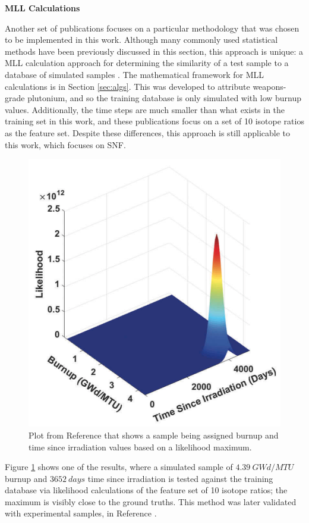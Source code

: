 \noindent \textbf{MLL Calculations}

Another set of publications focuses on a particular methodology that was chosen
to be implemented in this work. Although many commonly used statistical methods
have been previously discussed in this section, this approach is unique: a
\gls{MLL} calculation approach for determining the similarity of a test sample
to a database of simulated samples \cite{mll_method}.  The mathematical
framework for \gls{MLL} calculations is in Section \ref{sec:algs}.  This was
developed to attribute weapons-grade plutonium, and so the training database is
only simulated with low burnup values.  Additionally, the time steps are much
smaller than what exists in the training set in this work, and these
publications focus on a set of 10 isotope ratios as the feature set.  Despite
these differences, this approach is still applicable to this work, which
focuses on \gls{SNF}. 

\begin{figure}[!htb]
  \centering
  \includegraphics[width=0.6\linewidth]{./chapters/litrev/tamu.png}
  \caption{Plot from Reference \cite{mll_method} that shows a sample being 
           assigned burnup and time since irradiation values based on a 
           likelihood maximum.}
  \label{fig:tamu}
\end{figure}

Figure \ref{fig:tamu} shows one of the results, where a simulated sample of
$4.39\:GWd/MTU$ burnup and $3652\:days$ time since irradiation is tested
against the training database via likelihood calculations of the feature set of
10 isotope ratios; the maximum is visibly close to the ground truths.  This
method was later validated with experimental samples, in Reference
\cite{mll_validate}. 

